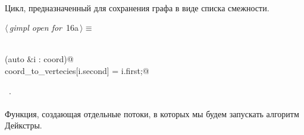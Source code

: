 \documentclass[12pt]{article}
\begin{document}
\paragraph{}
Цикл, предназначенный для сохранения графа в виде списка смежности.

\begin{flushleft} \small
\begin{minipage}{\linewidth}\label{scrap25}\raggedright\small
{} $\langle\,${\itshape gimpl open for}\nobreak\ {\footnotesize {16a}}$\,\rangle\equiv$
\vspace{-1ex}
\begin{list}{}{} \item
\mbox{}\verb@@\\
\mbox{}\verb@for (auto &i : coord)@\\
\mbox{}\verb@    coord_to_vertecies[i.second] = i.first;@\\
\mbox{}\verb@@{\NWsep}
\end{list}
\vspace{-1.5ex}
\footnotesize
\begin{list}{}{\setlength{\itemsep}{-\parsep}\setlength{\itemindent}{-\leftmargin}}
\item \NWtxtMacroRefIn\ .

\item{}
\end{list}
\end{minipage}\vspace{4ex}
\end{flushleft}
\paragraph{}
Функция, создающая отдельные потоки, в которых мы будем запускать алгоритм Дейкстры.
\end{document}
